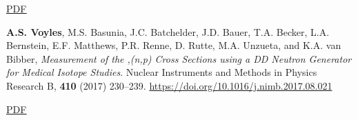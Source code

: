 \begin{bibsection}
\ifshort \vspace{0.1cm} \href{https://avoyles.github.io/papers/Ayllon2018_geochronology.pdf}{\underline{PDF}} \else  \fi 


\item \textbf{A.S. Voyles}, M.S. Basunia, J.C. Batchelder, J.D. Bauer, T.A. Becker, L.A. Bernstein, E.F. Matthews, P.R. Renne, D. Rutte, M.A. Unzueta, and K.A. van Bibber, \emph{Measurement of the ,(n,p) Cross Sections using a DD Neutron Generator for Medical Isotope Studies}. Nuclear Instruments and Methods in Physics Research  B, \textbf{410} (2017) 230--239. \url{https://doi.org/10.1016/j.nimb.2017.08.021}

\ifshort \vspace{0.1cm} \href{https://avoyles.github.io/papers/Voyles2017_HFNG.pdf}{\underline{PDF}} \else  \fi 











\end{bibsection}
